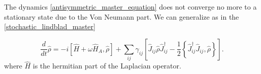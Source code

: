 The dynamics \eqref{antisymmetric_master_equation} does not converge no more to a stationary state due to the Von Neumann part.
We can generalize as in the \eqref{stochastic_lindblad_master} 

\begin{equation}
    \frac{d}{dt}\hat \rho = -i\left[\hat H + \omega\hat H_{A},\hat\rho\right] + \sum_{ij}\gamma_{ij}\left[\hat J_{ij} \hat\rho\hat J_{ij}^\dagger -\frac{1}{2} \left\{ \hat J_{ij}^\dagger \hat J_{ij}, \hat\rho\right\}\right].
\end{equation}
where $\hat H$ is the hermitian part of the Laplacian operator.
